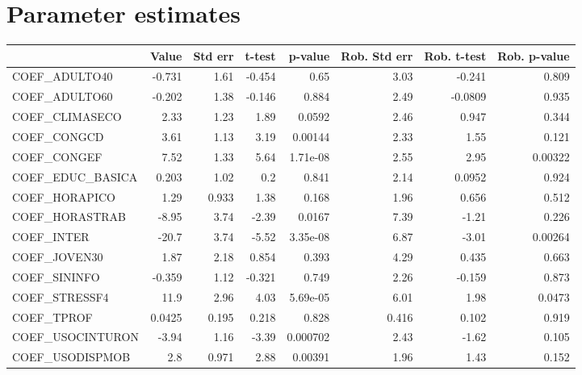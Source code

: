 \section{Parameter estimates}
\begin{tabular}{lrrrrrrr}
\toprule
{} &  Value &  Std err &  t-test &  p-value &  Rob. Std err &  Rob. t-test &  Rob. p-value \\
\midrule
COEF\_ADULTO40      & -0.731 &     1.61 &  -0.454 &     0.65 &          3.03 &       -0.241 &         0.809 \\
COEF\_ADULTO60      & -0.202 &     1.38 &  -0.146 &    0.884 &          2.49 &      -0.0809 &         0.935 \\
COEF\_CLIMASECO     &   2.33 &     1.23 &    1.89 &   0.0592 &          2.46 &        0.947 &         0.344 \\
COEF\_CONGCD        &   3.61 &     1.13 &    3.19 &  0.00144 &          2.33 &         1.55 &         0.121 \\
COEF\_CONGEF        &   7.52 &     1.33 &    5.64 & 1.71e-08 &          2.55 &         2.95 &       0.00322 \\
COEF\_EDUC\_BASICA   &  0.203 &     1.02 &     0.2 &    0.841 &          2.14 &       0.0952 &         0.924 \\
COEF\_HORAPICO      &   1.29 &    0.933 &    1.38 &    0.168 &          1.96 &        0.656 &         0.512 \\
COEF\_HORASTRAB     &  -8.95 &     3.74 &   -2.39 &   0.0167 &          7.39 &        -1.21 &         0.226 \\
COEF\_INTER         &  -20.7 &     3.74 &   -5.52 & 3.35e-08 &          6.87 &        -3.01 &       0.00264 \\
COEF\_JOVEN30       &   1.87 &     2.18 &   0.854 &    0.393 &          4.29 &        0.435 &         0.663 \\
COEF\_SININFO       & -0.359 &     1.12 &  -0.321 &    0.749 &          2.26 &       -0.159 &         0.873 \\
COEF\_STRESSF4      &   11.9 &     2.96 &    4.03 & 5.69e-05 &          6.01 &         1.98 &        0.0473 \\
COEF\_TPROF         & 0.0425 &    0.195 &   0.218 &    0.828 &         0.416 &        0.102 &         0.919 \\
COEF\_USOCINTURON   &  -3.94 &     1.16 &   -3.39 & 0.000702 &          2.43 &        -1.62 &         0.105 \\
COEF\_USODISPMOB    &    2.8 &    0.971 &    2.88 &  0.00391 &          1.96 &         1.43 &         0.152 \\

\end{tabular}
